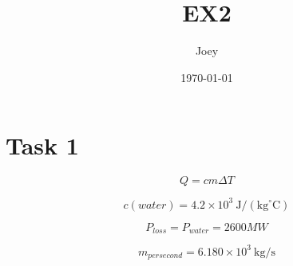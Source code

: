 \documentclass{article}
\title{EX2}
\author{Joey}
\date{\today}
\begin{document}
\maketitle

\section{Task 1}

\begin{equation}
    Q=c m \Delta T
\end{equation}

\begin{equation}
    c(water) = 4.2 \times 10^{3} \mathrm{~J} /\left(\mathrm{kg}^{\circ} \mathrm{C}\right)
\end{equation}

\begin{equation}
    P_{loss} = P_{water} = 2600MW
\end{equation}

\begin{equation}
    m_{per second} = 6.180 \times 10^{3} \mathrm{~kg} /\mathrm{s}
\end{equation}
\end{document}

